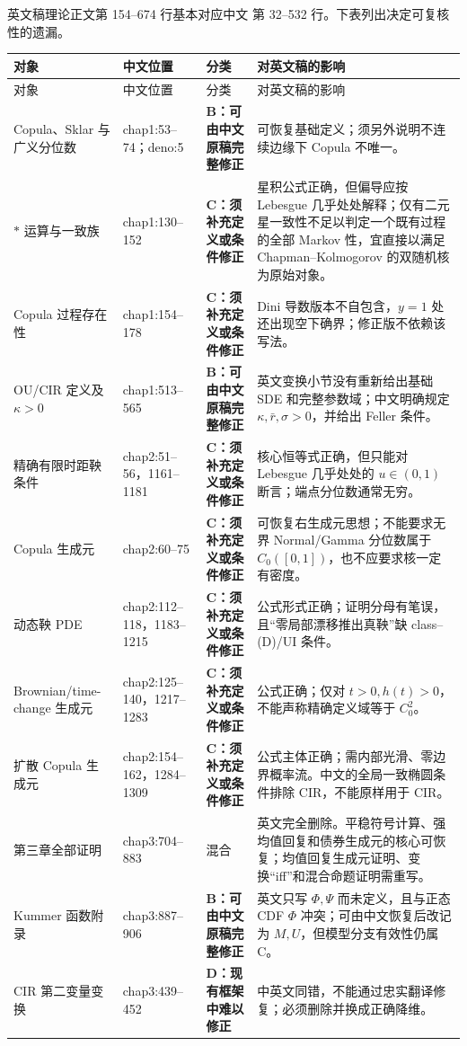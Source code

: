 \documentclass[UTF8,11pt]{ctexart}
\newcommand{\Bcat}{\textcolor{blue!65!black}{\textbf{B：可由中文原稿完整修正}}}
\newcommand{\Ccat}{\textcolor{orange!80!black}{\textbf{C：须补充定义或条件修正}}}
\newcommand{\Dcat}{\textcolor{red!70!black}{\textbf{D：现有框架中难以修正}}}
\begin{document}
英文稿理论正文第 154--674 行基本对应中文  第 32--532 行。下表列出决定可复核性的遗漏。

\begin{longtable}{p{}p{}p{}p{}}
\toprule
对象 & 中文位置 & 分类 & 对英文稿的影响\\
\midrule
\endfirsthead
\toprule
对象 & 中文位置 & 分类 & 对英文稿的影响\\
\midrule
\endhead
Copula、Sklar 与广义分位数 & chap1:53--74；deno:5 & \Bcat & 可恢复基础定义；须另外说明不连续边缘下 Copula 不唯一。\\
$*$ 运算与一致族 & chap1:130--152 & \Ccat & 星积公式正确，但偏导应按 Lebesgue 几乎处处解释；仅有二元星一致性不足以判定一个既有过程的全部 Markov 性，宜直接以满足 Chapman--Kolmogorov 的双随机核为原始对象。\\
Copula 过程存在性 & chap1:154--178 & \Ccat & Dini 导数版本不自包含，$y=1$ 处还出现空下确界；修正版不依赖该写法。\\
OU/CIR 定义及 $\kappa>0$ & chap1:513--565 & \Bcat & 英文变换小节没有重新给出基础 SDE 和完整参数域；中文明确规定 $\kappa,\bar r,\sigma>0$，并给出 Feller 条件。\\
精确有限时距鞅条件 & chap2:51--56，1161--1181 & \Ccat & 核心恒等式正确，但只能对 Lebesgue 几乎处处的 $u\in(0,1)$ 断言；端点分位数通常无穷。\\
Copula 生成元 & chap2:60--75 & \Ccat & 可恢复右生成元思想；不能要求无界 Normal/Gamma 分位数属于 $C_0([0,1])$，也不应要求核一定有密度。\\
动态鞅 PDE & chap2:112--118，1183--1215 & \Ccat & 公式形式正确；证明分母有笔误，且“零局部漂移推出真鞅”缺 class--(D)/UI 条件。\\
Brownian/time-change 生成元 & chap2:125--140，1217--1283 & \Ccat & 公式正确；仅对 $t>0,h(t)>0$，不能声称精确定义域等于 $C_0^2$。\\
扩散 Copula 生成元 & chap2:154--162，1284--1309 & \Ccat & 公式主体正确；需内部光滑、零边界概率流。中文的全局一致椭圆条件排除 CIR，不能原样用于 CIR。\\
第三章全部证明 & chap3:704--883 & 混合 & 英文完全删除。平稳符号计算、强均值回复和债券生成元的核心可恢复；均值回复生成元证明、变换“iff”和混合命题证明需重写。\\
Kummer 函数附录 & chap3:887--906 & \Bcat & 英文只写 $\Phi,\Psi$ 而未定义，且与正态 CDF $\Phi$ 冲突；可由中文恢复后改记为 $M,U$，但模型分支有效性仍属 C。\\
CIR 第二变量变换 & chap3:439--452 & \Dcat & 中英文同错，不能通过忠实翻译修复；必须删除并换成正确降维。\\
\bottomrule
\end{longtable}
\end{document}
